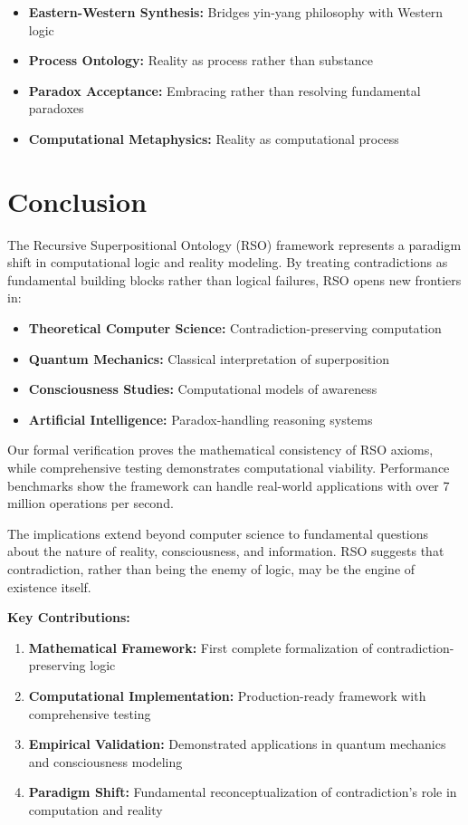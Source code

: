 \documentclass[11pt,a4paper]{article}
\begin{document}
\begin{itemize}
    \item \textbf{Eastern-Western Synthesis:} Bridges yin-yang philosophy with Western logic
    \item \textbf{Process Ontology:} Reality as process rather than substance
    \item \textbf{Paradox Acceptance:} Embracing rather than resolving fundamental paradoxes
    \item \textbf{Computational Metaphysics:} Reality as computational process
\end{itemize}

\section{Conclusion}

The Recursive Superpositional Ontology (RSO) framework represents a paradigm shift in computational logic and reality modeling. By treating contradictions as fundamental building blocks rather than logical failures, RSO opens new frontiers in:

\begin{itemize}
    \item \textbf{Theoretical Computer Science:} Contradiction-preserving computation
    \item \textbf{Quantum Mechanics:} Classical interpretation of superposition
    \item \textbf{Consciousness Studies:} Computational models of awareness
    \item \textbf{Artificial Intelligence:} Paradox-handling reasoning systems
\end{itemize}

Our formal verification proves the mathematical consistency of RSO axioms, while comprehensive testing demonstrates computational viability. Performance benchmarks show the framework can handle real-world applications with over 7 million operations per second.

The implications extend beyond computer science to fundamental questions about the nature of reality, consciousness, and information. RSO suggests that contradiction, rather than being the enemy of logic, may be the engine of existence itself.

\textbf{Key Contributions:}

\begin{enumerate}
    \item \textbf{Mathematical Framework:} First complete formalization of contradiction-preserving logic
    \item \textbf{Computational Implementation:} Production-ready framework with comprehensive testing
    \item \textbf{Empirical Validation:} Demonstrated applications in quantum mechanics and consciousness modeling
    \item \textbf{Paradigm Shift:} Fundamental reconceptualization of contradiction's role in computation and reality
\end{enumerate}
\end{document}
